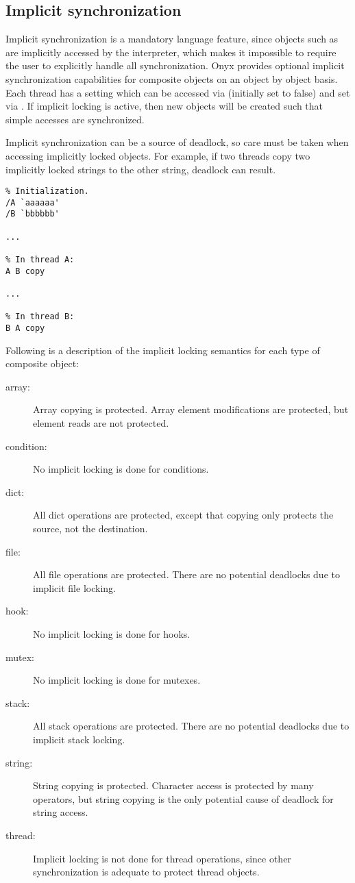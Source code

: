 \subsection{Implicit synchronization}

Implicit synchronization is a mandatory language feature, since objects such as
 are implicitly accessed by the
interpreter, which makes it impossible to require the user to explicitly handle
all synchronization.  Onyx provides optional implicit synchronization
capabilities for composite objects on an object by object basis.  Each thread
has a setting which can be accessed via
 (initially set to false) and
set via .  If implicit locking is
active, then new objects will be created such that simple accesses are
synchronized.

Implicit synchronization can be a source of deadlock, so care must be taken when
accessing implicitly locked objects.  For example, if two threads copy two
implicitly locked strings to the other string, deadlock can result.

\begin{verbatim}
% Initialization.
/A `aaaaaa'
/B `bbbbbb'

...

% In thread A:
A B copy

...

% In thread B:
B A copy
\end{verbatim}

Following is a description of the implicit locking semantics for each type of
composite object:
\begin{description}
\item[array: ] Array copying is protected.  Array element modifications are
protected, but element reads are not protected.
\item[condition: ] No implicit locking is done for conditions.
\item[dict: ] All dict operations are protected, except that copying only
protects the source, not the destination.
\item[file: ] All file operations are protected.  There are no potential
deadlocks due to implicit file locking.
\item[hook: ] No implicit locking is done for hooks.
\item[mutex: ] No implicit locking is done for mutexes.
\item[stack: ] All stack operations are protected.  There are no potential
deadlocks due to implicit stack locking.
\item[string: ] String copying is protected.  Character access is protected by
many operators, but string copying is the only potential cause of deadlock for
string access.
\item[thread: ]  Implicit locking is not done for thread operations, since other
synchronization is adequate to protect thread objects.
\end{description}

